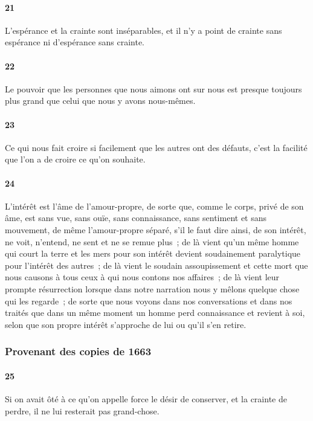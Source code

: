 \documentclass[french,twoside]{book} %
\begin{document}
\paragraph[{21}]{ \textsc{21} }
\noindent L’espérance et la crainte sont inséparables, et il n’y a point de crainte sans espérance ni d’espérance sans crainte.
\paragraph[{22}]{ \textsc{22} }
\noindent Le pouvoir que les personnes que nous aimons ont sur nous est presque toujours plus grand que celui que nous y avons nous-mêmes.
\paragraph[{23}]{ \textsc{23} }
\noindent Ce qui nous fait croire si facilement que les autres ont des défauts, c’est la facilité que l’on a de croire ce qu’on souhaite.
\paragraph[{24}]{ \textsc{24} }
\noindent L’intérêt est l’âme de l’amour-propre, de sorte que, comme le corps, privé de son âme, est sans vue, sans ouïe, sans connaissance, sans sentiment et sans mouvement, de même l’amour-propre séparé, s’il le faut dire ainsi, de son intérêt, ne voit, n’entend, ne sent et ne se remue plus ; de là vient qu’un même homme qui court la terre et les mers pour son intérêt devient soudainement paralytique pour l’intérêt des autres ; de là vient le soudain assoupissement et cette mort que nous causons à tous ceux à qui nous contons nos affaires ; de là vient leur prompte résurrection lorsque dans notre narration nous y mêlons quelque chose qui les regarde ; de sorte que nous voyons dans nos conversations et dans nos traités que dans un même moment un homme perd connaissance et revient à soi, selon que son propre intérêt s’approche de lui ou qu’il s’en retire.
\subsubsection[{Provenant des copies de 1663}]{Provenant des copies de 1663}
\paragraph[{25}]{ \textsc{25} }
\noindent Si on avait ôté à ce qu’on appelle force le désir de conserver, et la crainte de perdre, il ne lui resterait pas grand-chose.
\end{document}
